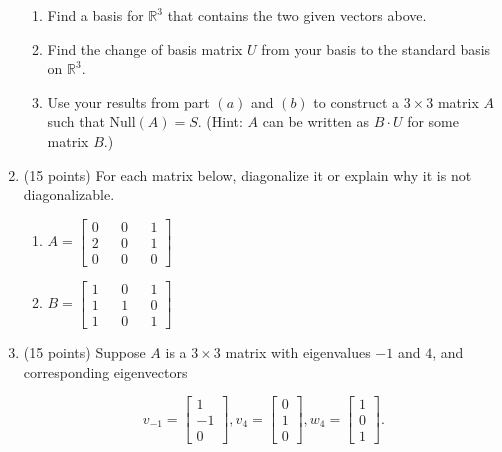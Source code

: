\documentclass[12 pt]{report}
\begin{document}
\begin{enumerate}
\begin{enumerate} \item Find a basis for $\mathbb{R}^3$ that contains the two given vectors above. 

\vfill

\item Find the change of basis matrix $U$ from your basis to the standard basis on $\mathbb{R}^3$. 

\vfill

\item Use your results from part $(a)$ and $(b)$ to construct a $3 \times 3$ matrix $A$ such that Null$(A) = S$. (Hint: $A$ can be written as $B \cdot U$ for some matrix $B$.)

\vfill


\end{enumerate}

\newpage

\item(15 points) For each matrix below, diagonalize it or explain why it is not diagonalizable. 

\begin{enumerate} \item $A = \begin{bmatrix} 0 && 0 && 1 \\ 2 && 0 &&1 \\ 0 && 0 && 0 \end{bmatrix} $

\vfill

\item $B = \begin{bmatrix} 1 && 0 && 1 \\ 1 && 1 && 0 \\ 1 && 0 && 1 \end{bmatrix}$
\vfill
\end{enumerate}

\newpage

\item(15 points) Suppose $A$ is a $3 \times 3$ matrix with eigenvalues $-1$ and $4$, and corresponding eigenvectors 

\[
v_{-1} = \begin{bmatrix} 1 \\ -1 \\ 0 \end{bmatrix}, v_{4} = \begin{bmatrix} 0 \\ 1 \\ 0 \end{bmatrix}, w_4 = \begin{bmatrix} 1 \\ 0 \\ 1 \end{bmatrix}.
\]


\end{enumerate}
\end{document}
